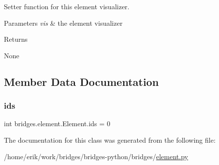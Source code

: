 Setter function for this element visualizer. 


\begin{DoxyParams}{Parameters}
{\em vis} & the element visualizer \\
\hline
\end{DoxyParams}
\begin{DoxyReturn}{Returns}


None 
\end{DoxyReturn}


\subsection{Member Data Documentation}
\mbox{\label{classbridges_1_1element_1_1_element_a61f02c915a65554b76dd6534e5a4d834}} 
\subsubsection{\texorpdfstring{ids}{ids}}
{\footnotesize\ttfamily int bridges.\+element.\+Element.\+ids = 0\hspace{0.3cm}{\ttfamily [static]}}



The documentation for this class was generated from the following file\+:\begin{DoxyCompactItemize}
\item 
/home/erik/work/bridges/bridges-\/python/bridges/\hyperlink{element_8py}{element.\+py}\end{DoxyCompactItemize}
